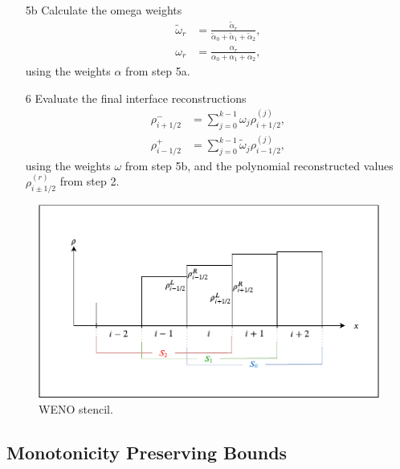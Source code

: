 \begin{enumerate}
	\item[5b] Calculate the omega weights
		\begin{align}
			\tilde\omega_r&=\frac{\tilde\alpha_r}{\tilde\alpha_0+\tilde\alpha_1+\tilde\alpha_2}, \\
			\omega_r&=\frac{\alpha_r}{\alpha_0+\alpha_1+\alpha_2},
		\end{align}
		using the weights $\alpha$ from step 5a.
		
	\item[6] Evaluate the final interface reconstructions
		\begin{align}
			\rho^{-}_{i+1/2}&=\sum_{j=0}^{k-1}\omega_j\rho^{(j)}_{i+1/2}, \\
			\rho^{+}_{i-1/2}&=\sum_{j=0}^{k-1}\tilde\omega_j\rho^{(j)}_{i-1/2},
		\end{align}
		using the weights $\omega$ from step 5b, and the polynomial reconstructed values $\rho_{i\pm1/2}^{(r)}$ from step 2.
\end{enumerate}

	\begin{figure}
    		\centering
        		\includegraphics[trim=35 35 20 40,clip,width=\textwidth]{WENO5.pdf}
		\caption[WENO reconstruction stencil]{WENO stencil.}
		\label{fig:app:weno}
	\end{figure}
	
\subsection{Monotonicity Preserving Bounds}
\label{ap:monotonicitypreservingbounds}

